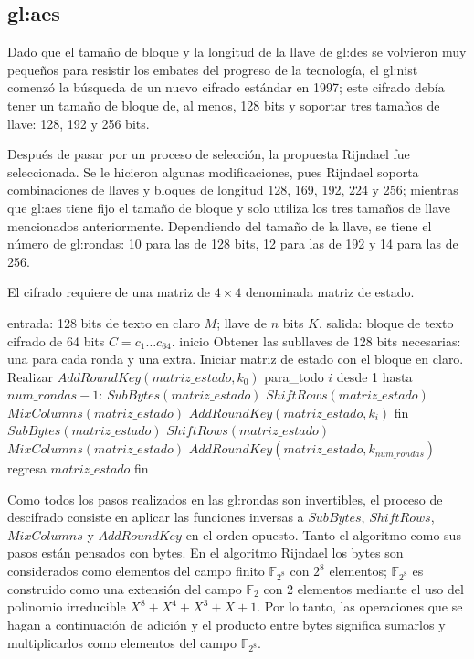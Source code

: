%
%

\subsection{\texorpdfstring{\acrfull{gl:aes}}{Advanced Encryption Standard (AES)}}
\label{sec:aes}

Dado que el tamaño de bloque y la longitud de la llave de \gls{gl:des}
se volvieron muy pequeños para resistir los embates del progreso
de la tecnología, el \gls{gl:nist} comenzó la búsqueda de un nuevo cifrado
estándar en 1997; este cifrado debía tener un tamaño de bloque de,
al menos, 128 bits y soportar tres tamaños de llave: 128, 192 y 256 bits.

Después de pasar por un proceso de selección, la propuesta Rijndael fue
seleccionada. Se le hicieron algunas modificaciones, pues Rijndael soporta
combinaciones de llaves y bloques de longitud 128, 169, 192, 224 y 256;
mientras que \gls{gl:aes} tiene fijo el tamaño de bloque y solo utiliza
los tres tamaños de llave mencionados anteriormente. Dependiendo del tamaño
de la llave, se tiene el número de \glspl{gl:ronda}: 10 para las de 128 bits,
12 para las de 192 y 14 para las de 256.

El cifrado requiere de una matriz de $4 \times 4$ denominada matriz de
estado.

\begin{pseudocodigo}[caption={AES, cifrado.}, label={aes:1}]
    entrada:    128 bits de texto en claro $M$; llave de $n$ bits $K$.
    salida:     bloque de texto cifrado de 64 bits $C = c_1 \dots c_{64}$.
    inicio
      Obtener las subllaves de 128 bits necesarias: una para cada ronda y una extra.
      Iniciar matriz de estado con el bloque en claro.
      Realizar $AddRoundKey(matriz\_estado, k_0)$
      para_todo $i$ desde 1 hasta $num\_rondas-1$:
        $SubBytes(matriz\_estado)$
        $ShiftRows(matriz\_estado)$
        $MixColumns(matriz\_estado)$
        $AddRoundKey(matriz\_estado, k_i)$
      fin
      $SubBytes(matriz\_estado)$
      $ShiftRows(matriz\_estado)$
      $MixColumns(matriz\_estado)$
      $AddRoundKey(matriz\_estado, k_{num\_rondas})$
      regresa $matriz\_estado$
    fin
\end{pseudocodigo}

Como todos los pasos realizados en las \glspl{gl:ronda} son invertibles, el
proceso de descifrado consiste en aplicar las funciones inversas a
$SubBytes$, $ShiftRows$, $MixColumns$ y $AddRoundKey$ en el orden
opuesto. Tanto el algoritmo como sus pasos están pensados con bytes.
En el algoritmo Rijndael los bytes son considerados como elementos del
campo finito $\mathbb{F}_{2^8}$ con ${2^8}$ elementos; $\mathbb{F}_{2^8}$
es construido como una extensión del campo  $\mathbb{F}_{2}$ con 2 elementos
mediante el uso del polinomio irreducible $X^8+X^4+X^3+X+1$.
Por lo tanto, las operaciones que se hagan a continuación de adición y el
producto entre bytes significa sumarlos y multiplicarlos como elementos del
campo  $\mathbb{F}_{2^8}$.


